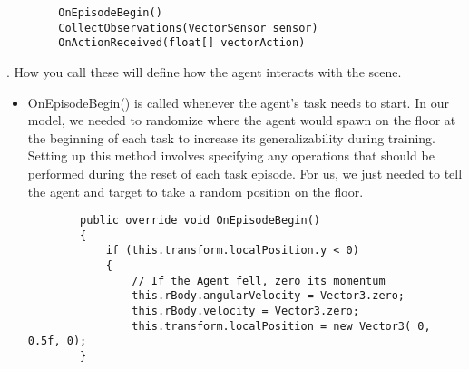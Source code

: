 \documentclass[11pt,fleqn,openany]{book} %
\begin{document}
\begin{itemize}
\begin{verbatim}
        OnEpisodeBegin()
        CollectObservations(VectorSensor sensor)
        OnActionReceived(float[] vectorAction)
    \end{verbatim}. How you call these will define how the agent interacts with the scene.
    \begin{itemize}
        \item OnEpisodeBegin() is called whenever the agent's task needs to start. In our model, we needed to randomize where the agent would spawn on the floor at the beginning of each task to increase its generalizability during training. Setting up this method involves specifying any operations that should be performed during the reset of each task episode. For us, we just needed to tell the agent and target to take a random position on the floor.\begin{verbatim}
        public override void OnEpisodeBegin()
        {
            if (this.transform.localPosition.y < 0)
            {
                // If the Agent fell, zero its momentum
                this.rBody.angularVelocity = Vector3.zero;
                this.rBody.velocity = Vector3.zero;
                this.transform.localPosition = new Vector3( 0, 0.5f, 0);
        }


\end{verbatim}
\end{itemize}
\end{itemize}
\end{document}
